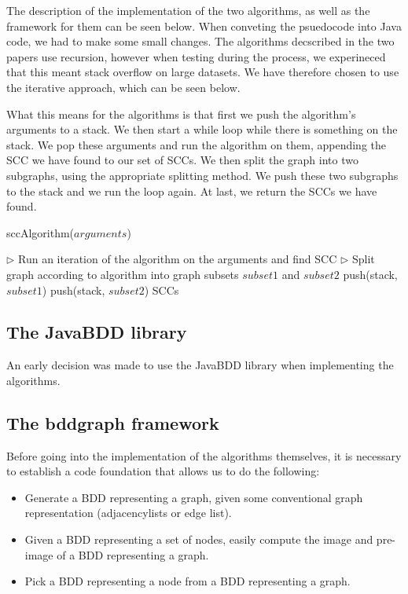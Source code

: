 \documentclass[../master/master.tex]{subfiles}
\begin{document}
The description of the implementation of the two algorithms, as well as the framework for them can be seen below. When conveting the psuedocode into Java code, we had to make some small changes. The algorithms decscribed in the two papers \cite{lockstep}\cite{linear} use recursion, however when testing during the process, we experineced that this meant stack overflow on large datasets. We have therefore chosen to use the iterative approach, which can be seen below.

What this means for the algorithms is that first we push the algorithm's arguments to a stack. We then start a while loop while there is something on the stack. We pop these arguments and run the algorithm on them, appending the SCC we have found to our set of SCCs. We then split the graph into two subgraphs, using the appropriate splitting method. We push these two subgraphs to the stack and we run the loop again. At last, we return the SCCs we have found.

\begin{algorithm}[H]
  \caption{sccAlgorithm($arguments$)}
  \begin{algorithmic}[1]
    \Statex
    \State \(\triangleright\) Run an iteration of the algorithm on the arguments and find SCC
    \State \(\triangleright\) Split graph according to algorithm into graph subsets $subset1$ and $subset2$
    \State push(stack, $subset1$)
    \State push(stack, $subset2$)
    \EndWhile
    \Statex
    \State \Return SCCs
  \end{algorithmic}
\end{algorithm}

\subsection{The JavaBDD library}
An early decision was made to use the JavaBDD library when implementing the algorithms. \cite{whaley}

\subsection{The bddgraph framework}
Before going into the implementation of the algorithms themselves, it is necessary to establish a code foundation that allows us to do the following:
\begin{itemize}
\item Generate a BDD representing a graph, given some conventional graph representation (adjacencylists or edge list).
\item Given a BDD representing a set of nodes, easily compute the image and pre-image of a BDD representing a graph.
\item Pick a BDD representing a node from a BDD representing a graph.
\end{itemize}
\end{document}
